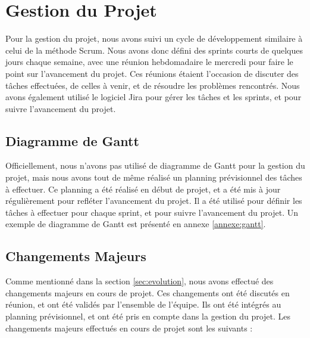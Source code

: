 \section{Gestion du Projet}

Pour la gestion du projet, nous avons suivi un cycle de développement similaire à celui de la méthode Scrum. 
Nous avons donc défini des sprints courts de quelques jours chaque semaine, avec une réunion hebdomadaire
le mercredi pour faire le point sur l'avancement du projet. 
Ces réunions étaient l'occasion de discuter des tâches effectuées, de celles à venir, et de résoudre les problèmes rencontrés.
Nous avons également utilisé le logiciel Jira pour gérer les tâches et les sprints, et pour suivre l'avancement du projet.

\subsection{Diagramme de Gantt}

Officiellement, nous n'avons pas utilisé de diagramme de Gantt pour la gestion du projet, mais nous avons tout de même
réalisé un planning prévisionnel des tâches à effectuer.
Ce planning a été réalisé en début de projet, et a été mis à jour régulièrement pour refléter l'avancement du projet.
Il a été utilisé pour définir les tâches à effectuer pour chaque sprint, et pour suivre l'avancement du projet.
Un exemple de diagramme de Gantt est présenté en annexe \ref{annexe:gantt}.


\subsection{Changements Majeurs}

Comme mentionné dans la section \ref{sec:evolution}, nous avons effectué des changements majeurs en cours de projet.
Ces changements ont été discutés en réunion, et ont été validés par l'ensemble de l'équipe.
Ils ont été intégrés au planning prévisionnel, et ont été pris en compte dans la gestion du projet.
Les changements majeurs effectués en cours de projet sont les suivants :


